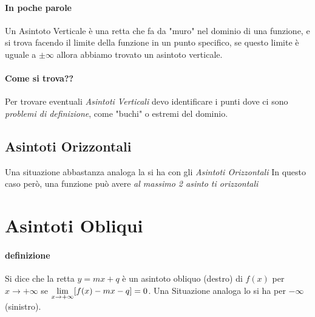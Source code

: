 \documentclass[12pt, a4paper, openany]{book}
\begin{document}
\paragraph*{In poche parole} Un Asintoto Verticale è una retta che fa da "muro" nel dominio di una funzione, e si trova facendo il limite della funzione in un punto specifico, se questo limite è uguale a $\pm \infty$ allora abbiamo trovato un asintoto verticale.

\paragraph*{Come si trova??} Per trovare eventuali \emph{Asintoti Verticali} devo identificare i punti dove ci sono \emph{problemi di definizione},
come "buchi" o estremi del dominio.

\subsection*{Asintoti Orizzontali}
Una situazione abbastanza analoga la si ha con gli \emph{Asintoti Orizzontali}
In questo caso però, una funzione può avere \emph{al massimo 2 asinto   ti orizzontali}

\section{Asintoti Obliqui}
\paragraph*{definizione}{ %
	Si dice che la retta $y=mx + q$ è un asintoto obliquo (destro) di $f(x)$ per $x \to +\infty$ se
	$\underset{x \to +\infty}{\lim} [f(x)-mx-q]=0$.
	Una Situazione analoga lo si ha per $-\infty $ (sinistro).
}
\end{document}
